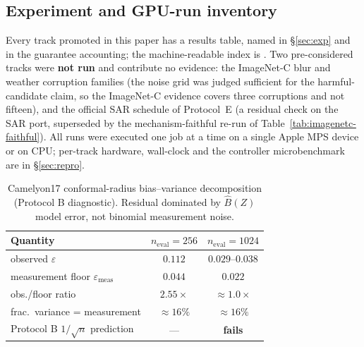 \documentclass[conference]{IEEEtran}
\theoremstyle{plain}
\theoremstyle{definition}
\begin{document}
\subsection{Experiment and GPU-run inventory}\label{app:inventory}
Every track promoted in this paper has a results table, named in \S\ref{sec:exp} and in the
guarantee accounting; the machine-readable index is
. Two pre-considered tracks were
\textbf{not run} and contribute no evidence: the ImageNet-C blur and weather corruption families
(the noise grid was judged sufficient for the harmful-candidate claim, so the ImageNet-C evidence
covers three corruptions and not fifteen), and the official SAR schedule of Protocol~E (a residual
check on the SAR port, superseded by the mechanism-faithful re-run of
Table~\ref{tab:imagenetc-faithful}). All runs were executed one job at a time on a single Apple MPS
device or on CPU; per-track hardware, wall-clock and the controller microbenchmark are in
\S\ref{sec:repro}.

\begin{table}[t]\centering\footnotesize
\caption{Camelyon17 conformal-radius bias--variance decomposition (Protocol B diagnostic).
Residual dominated by $\widehat{B}(Z)$ model error, not binomial measurement noise.}
\label{tab:bias-diag}
\begin{tabular}{lcc}
\toprule
Quantity & $n_{\mathrm{eval}}{=}256$ & $n_{\mathrm{eval}}{=}1024$ \\
\midrule
observed $\varepsilon$ & $0.112$ & $0.029$--$0.038$ \\
measurement floor $\varepsilon_{\mathrm{meas}}$ & $0.044$ & $0.022$ \\
obs./floor ratio & $2.55\times$ & $\approx\!1.0\times$ \\
frac.\ variance = measurement & $\approx\!16\%$ & $\approx\!16\%$ \\
Protocol B $1/\sqrt{n}$ prediction & --- & \textbf{fails} \\
\bottomrule
\end{tabular}
\end{table}
\end{document}
